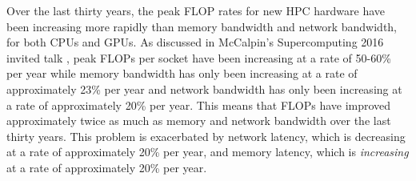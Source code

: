 Over the last thirty years, the peak FLOP rates for new HPC hardware have been increasing more rapidly than memory bandwidth and network bandwidth, for both CPUs and GPUs.
As discussed in McCalpin's Supercomputing 2016 invited talk \cite{mccalpin2016memory}, peak FLOPs per socket have been increasing at a rate of 50-60\% per year while memory bandwidth has only been increasing at a rate of approximately 23\% per year and network bandwidth has only been increasing at a rate of approximately 20\% per year.
This means that FLOPs have improved approximately twice as much as memory and network bandwidth over the last thirty years.
This problem is exacerbated by network latency, which is decreasing at a rate of approximately 20\% per year, and memory latency, which is \textit{increasing} at a rate of approximately 20\% per year.

